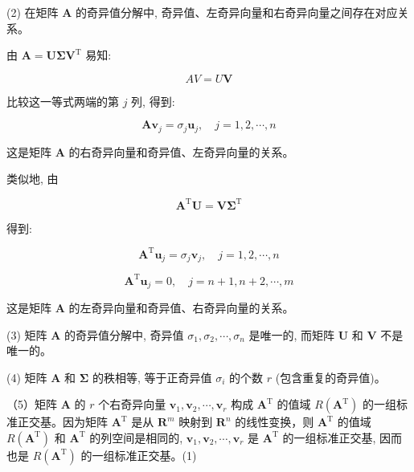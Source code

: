 \documentclass[10pt]{article}
\begin{document}
(2) 在矩阵 $\boldsymbol{A}$ 的奇异值分解中, 奇异值、左奇异向量和右奇异向量之间存在对应关系。

由 $\boldsymbol{A}=\boldsymbol{U} \boldsymbol{\Sigma} \boldsymbol{V}^{\mathrm{T}}$ 易知:

$$
A V=U \boldsymbol{V}
$$

比较这一等式两端的第 $j$ 列, 得到:


\begin{equation*}
\boldsymbol{A} \boldsymbol{v}_{j}=\sigma_{j} \boldsymbol{u}_{j}, \quad j=1,2, \cdots, n \tag{15.22}
\end{equation*}


这是矩阵 $\boldsymbol{A}$ 的右奇异向量和奇异值、左奇异向量的关系。

类似地, 由

$$
\boldsymbol{A}^{\mathrm{T}} \boldsymbol{U}=\boldsymbol{V} \boldsymbol{\Sigma}^{\mathrm{T}}
$$

得到:


\begin{equation*}
\boldsymbol{A}^{\mathrm{T}} \boldsymbol{u}_{j}=\sigma_{j} \boldsymbol{v}_{j}, \quad j=1,2, \cdots, n \tag{15.23}
\end{equation*}



\begin{equation*}
\boldsymbol{A}^{\mathrm{T}} \boldsymbol{u}_{j}=0, \quad j=n+1, n+2, \cdots, m \tag{15.24}
\end{equation*}


这是矩阵 $\boldsymbol{A}$ 的左奇异向量和奇异值、右奇异向量的关系。

(3) 矩阵 $\boldsymbol{A}$ 的奇异值分解中, 奇异值 $\sigma_{1}, \sigma_{2}, \cdots, \sigma_{n}$ 是唯一的, 而矩阵 $\boldsymbol{U}$ 和 $\boldsymbol{V}$ 不是唯一的。

(4) 矩阵 $\boldsymbol{A}$ 和 $\boldsymbol{\Sigma}$ 的秩相等, 等于正奇异值 $\sigma_{i}$ 的个数 $r$ (包含重复的奇异值)。

（5）矩阵 $\boldsymbol{A}$ 的 $r$ 个右奇异向量 $\boldsymbol{v}_{1}, \boldsymbol{v}_{2}, \cdots, \boldsymbol{v}_{r}$ 构成 $\boldsymbol{A}^{\mathrm{T}}$ 的值域 $R\left(\boldsymbol{A}^{\mathrm{T}}\right)$ 的一组标准正交基。因为矩阵 $\boldsymbol{A}^{\mathrm{T}}$ 是从 $\boldsymbol{R}^{m}$ 映射到 $\boldsymbol{R}^{n}$ 的线性变换，则 $\boldsymbol{A}^{\mathrm{T}}$ 的值域 $R\left(\boldsymbol{A}^{\mathrm{T}}\right)$ 和 $\boldsymbol{A}^{\mathrm{T}}$ 的列空间是相同的, $\boldsymbol{v}_{1}, \boldsymbol{v}_{2}, \cdots, \boldsymbol{v}_{r}$ 是 $\boldsymbol{A}^{\mathrm{T}}$ 的一组标准正交基, 因而也是 $R\left(\boldsymbol{A}^{\mathrm{T}}\right)$ 的一组标准正交基。(1)
\end{document}
